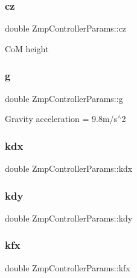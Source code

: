 \subsubsection{\texorpdfstring{cz}{cz}}
{\footnotesize\ttfamily double Zmp\+Controller\+Params\+::cz}

CoM height \hypertarget{structZmpControllerParams_a66ef6924d304ac0376ee64c2aa8234f9}{}\label{structZmpControllerParams_a66ef6924d304ac0376ee64c2aa8234f9} 
\subsubsection{\texorpdfstring{g}{g}}
{\footnotesize\ttfamily double Zmp\+Controller\+Params\+::g}

Gravity acceleration = 9.\+8m/s$^\wedge$2 \hypertarget{structZmpControllerParams_a423b5aa189459a96c2a271a656ccef48}{}\label{structZmpControllerParams_a423b5aa189459a96c2a271a656ccef48} 
\subsubsection{\texorpdfstring{kdx}{kdx}}
{\footnotesize\ttfamily double Zmp\+Controller\+Params\+::kdx}

\hypertarget{structZmpControllerParams_ab27d119cdbcb1ce102e7bd0c95e8d78c}{}\label{structZmpControllerParams_ab27d119cdbcb1ce102e7bd0c95e8d78c} 
\subsubsection{\texorpdfstring{kdy}{kdy}}
{\footnotesize\ttfamily double Zmp\+Controller\+Params\+::kdy}

\hypertarget{structZmpControllerParams_a92d3cbfd3c0c1f1df5115b97825889fb}{}\label{structZmpControllerParams_a92d3cbfd3c0c1f1df5115b97825889fb} 
\subsubsection{\texorpdfstring{kfx}{kfx}}
{\footnotesize\ttfamily double Zmp\+Controller\+Params\+::kfx}

